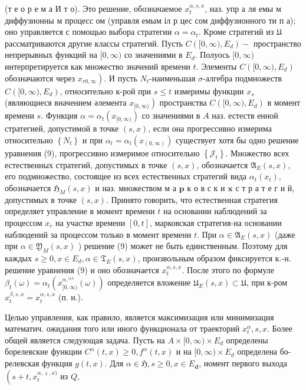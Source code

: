 \documentclass[10pt]{article}
\begin{document}
(т е о р е м а И т о). Это решение, обозначаемое $x_{t}^{\alpha, s, x}$, наз. упр а ля емы м диффузионны м процесс ом (управля емым іл р цес сом диффузионного ти п а); оно управляется с помощью выбора стратегии $\alpha=\alpha_{t}$. Кроме стратегий из $\mathfrak{U}$ рассматриваются другие классы стратегий. Пусть $C\left([0, \infty), E_{d}\right)-$ пространство непрерывных функций на $[0, \infty)$ со значениями в $E_{d}$. Полуось $[0, \infty)$ интерпретируется как множество значений времени $t$. Элементы $C\left([0, \infty), E_{d}\right)$ обозначаются через $\left.x_{r 0, \infty}\right)$. И пусть $N_{t}$-наименьшая $\sigma$-алгебра подмножеств $C\left([0, \infty), E_{d}\right)$, относительно к-рой при $s \leqslant t$ измеримы функции $x_{s}$ (являющиеся вначением әлемента $\left.x_{[0, \infty)}\right)$ пространства $C\left([0, \infty), E_{d}\right)$ в момент времени $s$. Функция $\alpha=\alpha_{t}\left(x_{[0, \infty)}\right)$ со значениями в $A$ наз. естеств енной стратегией, допустимой в точке $(s, x)$, если она прогрессивно измерима относительно $\left\{N_{t}\right\}$ и при $\alpha_{t}=\alpha_{t}\left(x_{(0, \infty)}\right)$ существует хотя бы одно решение уравнения (9), прогрессивно измеримое относительно $\left\{\mathscr{J}_{t}\right\}$. Множество всех естественных стратегий, допустимых в точке $(s, x)$, обозначается $\mathfrak{A}_{E}(s, x)$, его подмножество, состоящее из всех естественных стратегий вида $\alpha_{t}\left(x_{t}\right)$, обозначается $\mathfrak{H}_{M}(s, x)$ и наз. множеством м а $\mathbf{p}$ к о в с к и $\mathbf{x}$ с т р а т е г и й, допустимых в точке $(s, x)$. Принято говорить, что естественная стратегия определяет управление в момент времени $t$ на основании наблюдений за процессом $x_{r}$ на участке времени $[0, t]$, марковская стратегия-на основании наблюдений за процессом только в момент времени $t$. При $\alpha \in \mathfrak{A}_{E}(s, x)$ (даже при $\alpha \in \mathfrak{Y}_{M}(s, x)$ ) решение (9) может не быть единственным. Поэтому для каждых $s \geqslant 0, x \in E_{d}, \alpha \in \mathfrak{T}_{E}(s, x)$, произвольным образом фиксируется к.-н. решение уравнения (9) и оно обозначается $x_{t}^{\alpha, s, x}$. После этого по формуле $\beta_{t}(\omega)=\alpha_{t}\left(x_{[0, \infty)}^{\alpha,{ }^{\alpha}{ }^{x}}(\omega)\right)$ определяется вложение $\mathfrak{U}_{E}(s, x) \subset \mathfrak{U}$, при к-ром $x_{t}^{\beta, s, x}=x_{t}^{\alpha, s, x}$ (п. н.).



Целью управления, как правило, является максимизация или минимизация математич. ожидания того или иного функционала от траекторий $x_{t}^{\alpha}, s, x$. Более общей является следующая задача. Пусть на $A \times[0, \infty) \times E_{d}$ определены борелевские функции $C^{\alpha}(t, x) \geqslant 0, f^{\alpha}(t, x)$ и на $[0, \infty) \times E_{d}$ определена бо- релевская функция $g(t, x)$. Для $\alpha \in \mathfrak{H}, s \geqslant 0, x \in E_{\boldsymbol{d}}$, номент первого выхода $\left(s+t, x_{t}^{\alpha, \varsigma, x)}\right.$ из $Q$,
\end{document}
